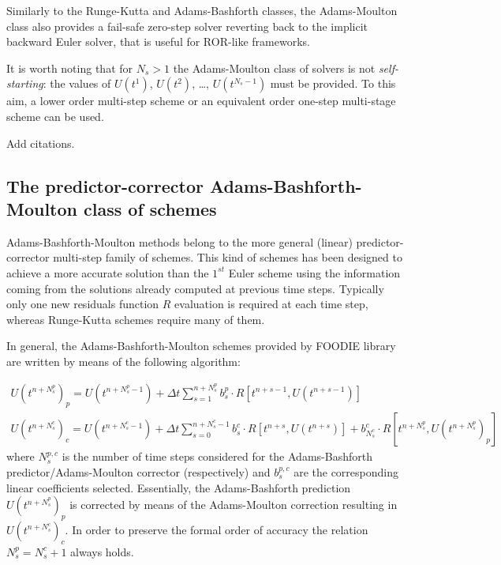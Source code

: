Similarly to the Runge-Kutta and Adams-Bashforth classes, the Adams-Moulton class also provides a fail-safe zero-step solver reverting back to the implicit backward Euler solver, that is useful for ROR-like frameworks.

It is worth noting that for $N_s>1$ the Adams-Moulton class of solvers is not \emph{self-starting}: the values of $U\left(t^{1}\right)$, $U\left(t^{2}\right)$, \dots, $U\left(t^{N_s-1}\right)$ must be provided. To this aim, a lower order multi-step scheme or an equivalent order one-step multi-stage scheme can be used.

{\color{red} Add citations.}

\subsection{The predictor-corrector Adams-Bashforth-Moulton class of schemes}

Adams-Bashforth-Moulton methods belong to the more general (linear) predictor-corrector multi-step family of schemes. This kind of schemes has been designed to achieve a more accurate solution than the $1^{st}$ Euler scheme using the information coming from the solutions already computed at previous time steps. Typically only one new residuals function $R$ evaluation is required at each time step, whereas Runge-Kutta schemes require many of them.

In general, the Adams-Bashforth-Moulton schemes provided by FOODIE library are written by means of the following algorithm:

\begin{equation}
  \begin{matrix}
    U\left(t^{n+N_s^p}\right)_p = U\left(t^{n+N_s^p-1}\right) +\Delta t \sum_{s=1}^{n+N_s^p}{ b_s^p \cdot R\left[t^{n+s-1}, U\left(t^{n+s-1}\right)\right]}   \\
    U\left(t^{n+N_s^c}\right)_c = U\left(t^{n+N_s^c-1}\right) +\Delta t \sum_{s=0}^{n+N_s^c-1}{ b_s^c \cdot R\left[t^{n+s}, U\left(t^{n+s}\right)\right]} + b_{N_s^c}^c\cdot R\left[t^{n+N_s^p}, U\left(t^{n+N_s^p}\right)_p\right]
  \end{matrix}
\label{eq:ABM}
\end{equation}
where $N_s^{p,c}$ is the number of time steps considered for the Adams-Bashforth predictor/Adams-Moulton corrector (respectively) and $b_s^{p,c}$ are the corresponding linear coefficients selected. Essentially, the Adams-Bashforth prediction $U\left(t^{n+N_s^p}\right)_p$ is corrected by means of the Adams-Moulton correction resulting in $U\left(t^{n+N_s^c}\right)_c$. In order to preserve the formal order of accuracy the relation $N_s^p=N_s^c+1$ always holds.

